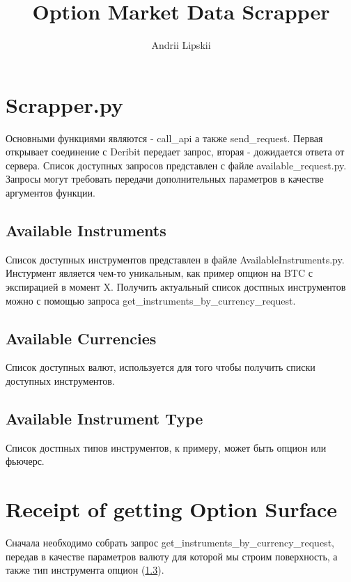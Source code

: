 \documentclass[11pt, oneside]{article}   	%
\title{Option Market Data Scrapper}
\author{Andrii Lipskii}
\begin{document}
\maketitle
\section{Scrapper.py}
    Основными функциями являются - call\_api а также send\_request.
    Первая открывает соединение с Deribit передает запрос, вторая - дожидается ответа от сервера.
    Список доступных запросов представлен с файле available\_request.py.
    Запросы могут требовать передачи дополнительных параметров в качестве аргументов функции.
    \subsection{Available Instruments}
        Список доступных инструментов представлен в файле AvailableInstruments.py.
        Инстурмент является чем-то уникальным, как пример опцион на BTC с экспирацией в момент X.
        Получить актуальный список достпных инструментов можно с помощью запроса get\_instruments\_by\_currency\_request.
    \subsection{Available Currencies}
        Список доступных валют, используется для того чтобы получить списки доступных инструментов.
    \subsection{Available Instrument Type}\label{subsec:insrument_type}
        Список достпных типов инструментов, к примеру, может быть опцион или фьючерс.


\section{Receipt of getting Option Surface}
    Сначала необходимо собрать запрос get\_instruments\_by\_currency\_request, передав в качестве параметров валюту для которой мы строим поверхность, а также тип инструмента опцион (\ref{subsec:insrument_type}).
\end{document}
